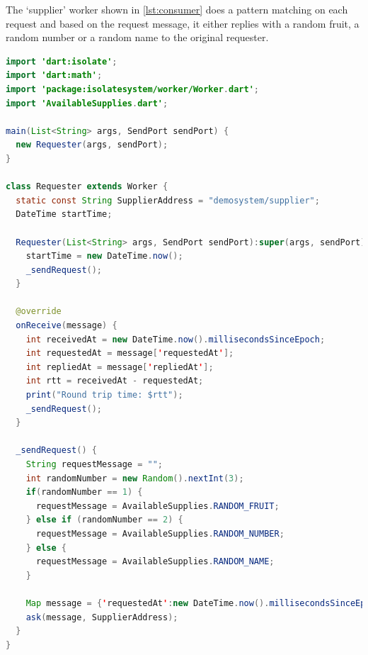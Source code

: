   The ‘supplier’ worker shown in \autoref{lst:consumer} does a pattern matching on each request and based on the request message, it either replies with a random fruit, a random number or a random name to the original requester.

\newpage
\begin{lstlisting}[language=java, firstnumber=1, caption=Requester Worker of Requester-Supplier application, label=lst:requester]
import 'dart:isolate';
import 'dart:math';
import 'package:isolatesystem/worker/Worker.dart';
import 'AvailableSupplies.dart';

main(List<String> args, SendPort sendPort) {
  new Requester(args, sendPort);
}

class Requester extends Worker {
  static const String SupplierAddress = "demosystem/supplier";
  DateTime startTime;

  Requester(List<String> args, SendPort sendPort):super(args, sendPort) {
    startTime = new DateTime.now();
    _sendRequest();
  }

  @override
  onReceive(message) {
    int receivedAt = new DateTime.now().millisecondsSinceEpoch;
    int requestedAt = message['requestedAt'];
    int repliedAt = message['repliedAt'];
    int rtt = receivedAt - requestedAt;
    print("Round trip time: $rtt");
    _sendRequest();
  }

  _sendRequest() {
    String requestMessage = "";
    int randomNumber = new Random().nextInt(3);
    if(randomNumber == 1) {
      requestMessage = AvailableSupplies.RANDOM_FRUIT;
    } else if (randomNumber == 2) {
      requestMessage = AvailableSupplies.RANDOM_NUMBER;
    } else {
      requestMessage = AvailableSupplies.RANDOM_NAME;
    }

    Map message = {'requestedAt':new DateTime.now().millisecondsSinceEpoch, 'requestMessage':requestMessage};
    ask(message, SupplierAddress);
  }
}

\end{lstlisting}

